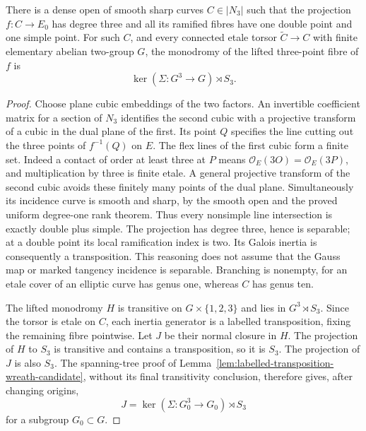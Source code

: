 \begin{lemma}
\label{lem:mixed-strip-lifted-triple-candidate}
There is a dense open of smooth sharp curves $C\in|N_3|$ such
that the projection $f:C\to E_0$ has degree three and all its
ramified fibres have one double point and one simple point.
For such $C$, and every connected etale torsor $\widetilde C\to C$
with finite elementary abelian two-group $G$, the monodromy of
the lifted three-point fibre of $f$ is
\[
                  \ker(\Sigma:G^3\to G)\rtimes S_3.
\]
\end{lemma}
\begin{proof}
Choose plane cubic embeddings of the two factors. An invertible
coefficient matrix for a section of $N_3$ identifies the second
cubic with a projective transform of a cubic in the dual plane
of the first. Its point $Q$ specifies the line cutting out the
three points of $f^{-1}(Q)$ on $E$. The flex lines of the first
cubic form a finite set. Indeed a contact of order at least
three at $P$ means $\mathcal O_E(3O)=\mathcal O_E(3P)$,
and multiplication by three is finite etale. A general projective
transform of the second cubic avoids these finitely many points
of the dual plane. Simultaneously its incidence curve is smooth
and sharp, by the smooth open and the proved uniform degree-one
rank theorem. Thus every nonsimple line intersection is exactly
double plus simple. The projection has degree three, hence is
separable; at a double point its local ramification index is two.
Its Galois inertia is consequently a transposition. This reasoning
does not assume that the Gauss map or marked tangency incidence
is separable. Branching is nonempty, for an etale cover of an
elliptic curve has genus one, whereas $C$ has genus ten.

The lifted monodromy $H$ is transitive on $G\times\{1,2,3\}$
and lies in $G^3\rtimes S_3$. Since the torsor is etale on $C$,
each inertia generator is a labelled transposition, fixing the
remaining fibre pointwise. Let $J$ be their normal closure in
$H$. The projection of $H$ to $S_3$ is transitive and contains a
transposition, so it is $S_3$. The projection of $J$ is also
$S_3$. The spanning-tree proof of
Lemma~\ref{lem:labelled-transposition-wreath-candidate}, without
its final transitivity conclusion, therefore gives, after changing
origins,
\[
                 J=\ker(\Sigma:G_0^3\to G_0)\rtimes S_3
\]
for a subgroup $G_0\subset G$.


\end{proof}
